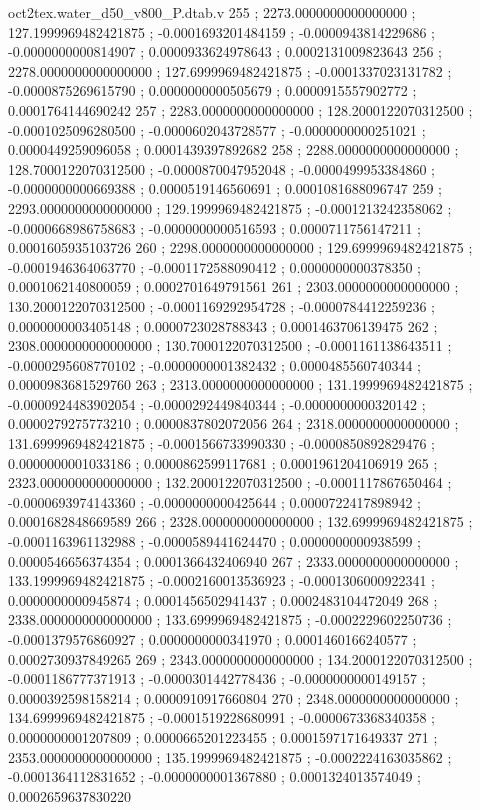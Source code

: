 \begin{filecontents}[overwrite]{oct2tex.water_d50_v800_P.dtab.v}
255 ; 2273.0000000000000000 ; 127.1999969482421875 ; -0.0001693201484159 ; -0.0000943814229686 ; -0.0000000000814907 ; 0.0000933624978643 ; 0.0002131009823643
256 ; 2278.0000000000000000 ; 127.6999969482421875 ; -0.0001337023131782 ; -0.0000875269615790 ; 0.0000000000505679 ; 0.0000915557902772 ; 0.0001764144690242
257 ; 2283.0000000000000000 ; 128.2000122070312500 ; -0.0001025096280500 ; -0.0000602043728577 ; -0.0000000000251021 ; 0.0000449259096058 ; 0.0001439397892682
258 ; 2288.0000000000000000 ; 128.7000122070312500 ; -0.0000870047952048 ; -0.0000499953384860 ; -0.0000000000669388 ; 0.0000519146560691 ; 0.0001081688096747
259 ; 2293.0000000000000000 ; 129.1999969482421875 ; -0.0001213242358062 ; -0.0000668986758683 ; -0.0000000000516593 ; 0.0000711756147211 ; 0.0001605935103726
260 ; 2298.0000000000000000 ; 129.6999969482421875 ; -0.0001946364063770 ; -0.0001172588090412 ; 0.0000000000378350 ; 0.0001062140800059 ; 0.0002701649791561
261 ; 2303.0000000000000000 ; 130.2000122070312500 ; -0.0001169292954728 ; -0.0000784412259236 ; 0.0000000003405148 ; 0.0000723028788343 ; 0.0001463706139475
262 ; 2308.0000000000000000 ; 130.7000122070312500 ; -0.0001161138643511 ; -0.0000295608770102 ; -0.0000000001382432 ; 0.0000485560740344 ; 0.0000983681529760
263 ; 2313.0000000000000000 ; 131.1999969482421875 ; -0.0000924483902054 ; -0.0000292449840344 ; -0.0000000000320142 ; 0.0000279275773210 ; 0.0000837802072056
264 ; 2318.0000000000000000 ; 131.6999969482421875 ; -0.0001566733990330 ; -0.0000850892829476 ; 0.0000000001033186 ; 0.0000862599117681 ; 0.0001961204106919
265 ; 2323.0000000000000000 ; 132.2000122070312500 ; -0.0001117867650464 ; -0.0000693974143360 ; -0.0000000000425644 ; 0.0000722417898942 ; 0.0001682848669589
266 ; 2328.0000000000000000 ; 132.6999969482421875 ; -0.0001163961132988 ; -0.0000589441624470 ; 0.0000000000938599 ; 0.0000546656374354 ; 0.0001366432406940
267 ; 2333.0000000000000000 ; 133.1999969482421875 ; -0.0002160013536923 ; -0.0001306000922341 ; 0.0000000000945874 ; 0.0001456502941437 ; 0.0002483104472049
268 ; 2338.0000000000000000 ; 133.6999969482421875 ; -0.0002229602250736 ; -0.0001379576860927 ; 0.0000000000341970 ; 0.0001460166240577 ; 0.0002730937849265
269 ; 2343.0000000000000000 ; 134.2000122070312500 ; -0.0001186777371913 ; -0.0000301442778436 ; -0.0000000000149157 ; 0.0000392598158214 ; 0.0000910917660804
270 ; 2348.0000000000000000 ; 134.6999969482421875 ; -0.0001519228680991 ; -0.0000673368340358 ; 0.0000000001207809 ; 0.0000665201223455 ; 0.0001597171649337
271 ; 2353.0000000000000000 ; 135.1999969482421875 ; -0.0002224163035862 ; -0.0001364112831652 ; -0.0000000001367880 ; 0.0001324013574049 ; 0.0002659637830220

\end{filecontents}
